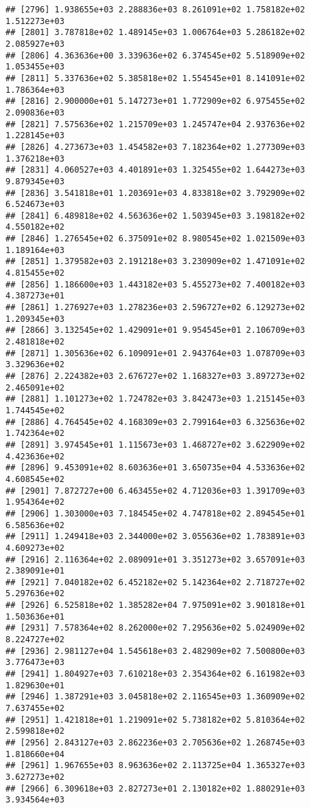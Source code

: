 \documentclass[]{article}
\begin{document}
\begin{verbatim}
## [2796] 1.938655e+03 2.288836e+03 8.261091e+02 1.758182e+02 1.512273e+03
## [2801] 3.787818e+02 1.489145e+03 1.006764e+03 5.286182e+02 2.085927e+03
## [2806] 4.363636e+00 3.339636e+02 6.374545e+02 5.518909e+02 1.053455e+03
## [2811] 5.337636e+02 5.385818e+02 1.554545e+01 8.141091e+02 1.786364e+03
## [2816] 2.900000e+01 5.147273e+01 1.772909e+02 6.975455e+02 2.090836e+03
## [2821] 7.575636e+02 1.215709e+03 1.245747e+04 2.937636e+02 1.228145e+03
## [2826] 4.273673e+03 1.454582e+03 7.182364e+02 1.277309e+03 1.376218e+03
## [2831] 4.060527e+03 4.401891e+03 1.325455e+02 1.644273e+03 9.879345e+03
## [2836] 3.541818e+01 1.203691e+03 4.833818e+02 3.792909e+02 6.524673e+03
## [2841] 6.489818e+02 4.563636e+02 1.503945e+03 3.198182e+02 4.550182e+02
## [2846] 1.276545e+02 6.375091e+02 8.980545e+02 1.021509e+03 1.189164e+03
## [2851] 1.379582e+03 2.191218e+03 3.230909e+02 1.471091e+02 4.815455e+02
## [2856] 1.186600e+03 1.443182e+03 5.455273e+02 7.400182e+03 4.387273e+01
## [2861] 1.276927e+03 1.278236e+03 2.596727e+02 6.129273e+02 1.209345e+03
## [2866] 3.132545e+02 1.429091e+01 9.954545e+01 2.106709e+03 2.481818e+02
## [2871] 1.305636e+02 6.109091e+01 2.943764e+03 1.078709e+03 3.329636e+02
## [2876] 2.224382e+03 2.676727e+02 1.168327e+03 3.897273e+02 2.465091e+02
## [2881] 1.101273e+02 1.724782e+03 3.842473e+03 1.215145e+03 1.744545e+02
## [2886] 4.764545e+02 4.168309e+03 2.799164e+03 6.325636e+02 1.742364e+02
## [2891] 3.974545e+01 1.115673e+03 1.468727e+02 3.622909e+02 4.423636e+02
## [2896] 9.453091e+02 8.603636e+01 3.650735e+04 4.533636e+02 4.608545e+02
## [2901] 7.872727e+00 6.463455e+02 4.712036e+03 1.391709e+03 1.954364e+02
## [2906] 1.303000e+03 7.184545e+02 4.747818e+02 2.894545e+01 6.585636e+02
## [2911] 1.249418e+03 2.344000e+02 3.055636e+02 1.783891e+03 4.609273e+02
## [2916] 2.116364e+02 2.089091e+01 3.351273e+02 3.657091e+03 2.389091e+01
## [2921] 7.040182e+02 6.452182e+02 5.142364e+02 2.718727e+02 5.297636e+02
## [2926] 6.525818e+02 1.385282e+04 7.975091e+02 3.901818e+01 1.503636e+01
## [2931] 7.578364e+02 8.262000e+02 7.295636e+02 5.024909e+02 8.224727e+02
## [2936] 2.981127e+04 1.545618e+03 2.482909e+02 7.500800e+03 3.776473e+03
## [2941] 1.804927e+03 7.610218e+03 2.354364e+02 6.161982e+03 1.829630e+01
## [2946] 1.387291e+03 3.045818e+02 2.116545e+03 1.360909e+02 7.637455e+02
## [2951] 1.421818e+01 1.219091e+02 5.738182e+02 5.810364e+02 2.599818e+02
## [2956] 2.843127e+03 2.862236e+03 2.705636e+02 1.268745e+03 1.818660e+04
## [2961] 1.967655e+03 8.963636e+02 2.113725e+04 1.365327e+03 3.627273e+02
## [2966] 6.309618e+03 2.827273e+01 2.130182e+02 1.880291e+03 3.934564e+03

\end{verbatim}
\end{document}
